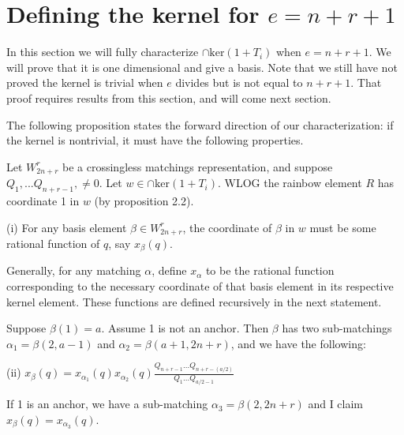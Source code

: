\documentclass{amsart}
\begin{document}
\newpage
\section{Defining the kernel for $e=n+r+1$}

In this section we will fully characterize $\cap\text{ker}(1+T_i)$ when $e=n+r+1$. We will prove that it is one dimensional and give a basis. Note that we still have not proved the kernel is trivial when $e$ divides but is not equal to $n+r+1$. That proof requires results from this section, and will come next section.

\vspace{5mm}
The following proposition states the forward direction of our characterization: if the kernel is nontrivial, it must have the following properties.

\vspace{5mm}
\begin{proposition}
	
	Let $W_{2n+r}^r$ be a crossingless matchings representation, and suppose $Q_1,...Q_{n+r-1},\not=0$. Let $w\in\cap\text{ker}(1+T_i)$. WLOG the rainbow element $R$ has coordinate 1 in $w$ (by proposition 2.2).
	\\
	
	\begin{center}	
		(i) For any basis element $\beta\in W_{2n+r}^r$, the coordinate of $\beta$ in $w$ must be some rational function of $q$, say $x_\beta(q)$.
		
	\end{center}
	\vspace{5mm}
	
	
	Generally, for any matching $\alpha$, define $x_\alpha$ to be the rational function corresponding to the necessary coordinate of that basis element in its respective kernel element. These functions are defined recursively in the next statement.
	
	\vspace{5mm}
	Suppose $\beta(1)=a$. Assume 1 is not an anchor. Then $\beta$ has two sub-matchings $\alpha_1=\beta(2,a-1)$ and $\alpha_2=\beta(a+1,2n+r)$, and we have the following:
	\\
	
	\begin{center}
		
		(ii) $x_\beta(q)=x_{\alpha_1}(q)x_{\alpha_2}(q)\frac{Q_{n+r-1}...Q_{n+r-(a/2)}}{Q_1...Q_{a/2-1}}$
		
		
	\end{center}
	
	\vspace{5mm}
	
	If 1 is an anchor, we have a sub-matching $\alpha_3=\beta(2,2n+r)$ and I claim $x_\beta(q)=x_{\alpha_3}(q)$. 
	
\end{proposition}
\end{document}
